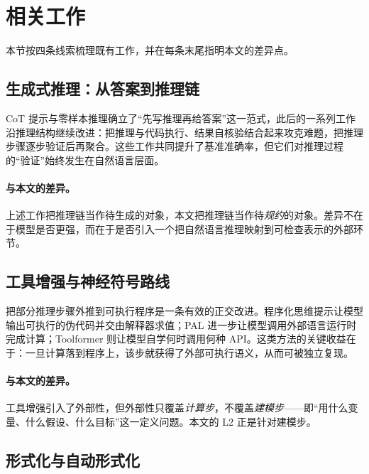 \section{相关工作}\label{sec:related}

本节按四条线索梳理既有工作，并在每条末尾指明本文的差异点。

\subsection{生成式推理：从答案到推理链}

CoT 提示\citep{wei2022chain}与零样本推理\citep{kojima2022large}确立了“先写推理再给答案”这一范式，此后的一系列工作沿推理结构继续改进：把推理与代码执行、结果自核验结合起来攻克难题\citep{zhou2023solving}，把推理步骤逐步验证后再聚合\citep{lightman2023let,uesato2022solving}。这些工作共同提升了基准准确率，但它们对推理过程的“验证”始终发生在自然语言层面。

\paragraph{与本文的差异。}上述工作把推理链当作待生成的对象，本文把推理链当作待\emph{规约}的对象。差异不在于模型是否更强，而在于是否引入一个把自然语言推理映射到可检查表示的外部环节。

\subsection{工具增强与神经符号路线}

把部分推理步骤外推到可执行程序是一条有效的正交改进。程序化思维提示让模型输出可执行的伪代码并交由解释器求值\citep{chen2022program}；PAL 进一步让模型调用外部语言运行时完成计算\citep{gao2022pal}；Toolformer 则让模型自学何时调用何种 API\citep{schick2023toolformer}。这类方法的关键收益在于：一旦计算落到程序上，该步就获得了外部可执行语义，从而可被独立复现。

\paragraph{与本文的差异。}工具增强引入了外部性，但外部性只覆盖\emph{计算步}，不覆盖\emph{建模步}——即“用什么变量、什么假设、什么目标”这一定义问题。本文的 L2 正是针对建模步。

\subsection{形式化与自动形式化}

